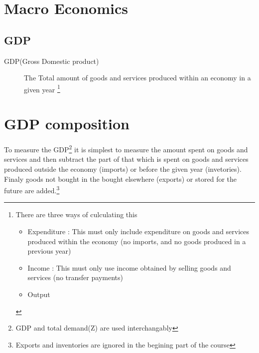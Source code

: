 \documentclass{tufte-book}
\begin{document}
\hypertarget{macro-economics}{%
\section{Macro Economics}\label{macro-economics}}

\hypertarget{gdp}{%
\subsection{GDP}\label{gdp}}

\begin{description}
\item[GDP(Gross Domestic product)]
The Total amount of goods and services produced within an economy in a
given year \footnote{There are three ways of culculating this

  \begin{itemize}
  \item
    Expenditure : This must only include expenditure on goods and
    services produced within the economy (no imports, and no goods
    produced in a previous year)
  \item
    Income : This must only use income obtained by selling goods and
    services (no transfer payments)
  \item
    Output
  \end{itemize}}
\end{description}

\hypertarget{gdp-composition}{%
\section{GDP composition}\label{gdp-composition}}

To measure the GDP\footnote{GDP and total demand(Z) are used
  interchangably} it is simplest to measure the amount spent on goods
and services and then subtract the part of that which is spent on goods
and services produced outside the economy (imports) or before the given
year (invetories). Finaly goods not bought in the bought elsewhere
(exports) or stored for the future are added.\footnote{Exports and
  inventories are ignored in the begining part of the course}
\end{document}
